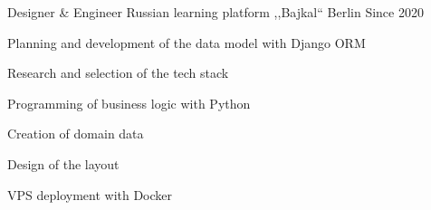 
\begin{cventries}

  \cventry
  {Designer \& Engineer} %
  {Russian learning platform ,,Bajkal``} %
  {Berlin} %
  {Since 2020} %
  {
    \begin{cvitems} %
    \item {Planning and development of the data model with Django ORM}
    \item {Research and selection of the tech stack}
    \item {Programming of business logic with Python}
    \item {Creation of domain data}
    \item {Design of the layout}
    \item {VPS deployment with Docker}
    \end{cvitems}
  }

\end{cventries}
